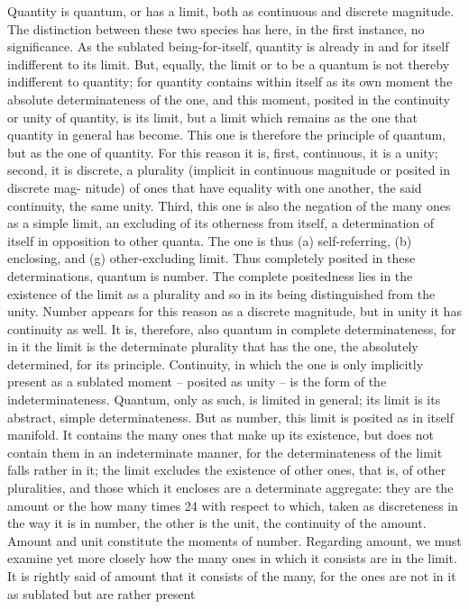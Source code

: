 Quantity is quantum, or has a limit, both as continuous and discrete
magnitude. The distinction between these two species has here, in the first
instance, no significance.
As the sublated being-for-itself, quantity is already in and for itself
indifferent to its limit. But, equally, the limit or to be a quantum is not
thereby indifferent to quantity; for quantity contains within itself as its
own moment the absolute determinateness of the one, and this moment,
posited in the continuity or unity of quantity, is its limit, but a limit which
remains as the one that quantity in general has become.
This one is therefore the principle of quantum, but as the one of quantity.
For this reason it is, first, continuous, it is a unity; second, it is discrete,
a plurality (implicit in continuous magnitude or posited in discrete mag-
nitude) of ones that have equality with one another, the said continuity,
the same unity. Third, this one is also the negation of the many ones as
a simple limit, an excluding of its otherness from itself, a determination
of itself in opposition to other quanta. The one is thus (a) self-referring,
(b) enclosing, and (g) other-excluding limit.
Thus completely posited in these determinations, quantum is number.
The complete positedness lies in the existence of the limit as a plurality
and so in its being distinguished from the unity. Number appears for this
reason as a discrete magnitude, but in unity it has continuity as well. It is,
therefore, also quantum in complete determinateness, for in it the limit is
the determinate plurality that has the one, the absolutely determined, for
its principle. Continuity, in which the one is only implicitly present as a
sublated moment – posited as unity – is the form of the indeterminateness.
Quantum, only as such, is limited in general; its limit is its abstract,
simple determinateness. But as number, this limit is posited as in itself
manifold. It contains the many ones that make up its existence, but does
not contain them in an indeterminate manner, for the determinateness of
the limit falls rather in it; the limit excludes the existence of other ones,
that is, of other pluralities, and those which it encloses are a determinate
aggregate: they are the amount or the how many times 24 with respect to
which, taken as discreteness in the way it is in number, the other is the
unit, the continuity of the amount. Amount and unit constitute the
moments of number.
Regarding amount, we must examine yet more closely how the many
ones in which it consists are in the limit. It is rightly said of amount that it
consists of the many, for the ones are not in it as sublated but are rather present
